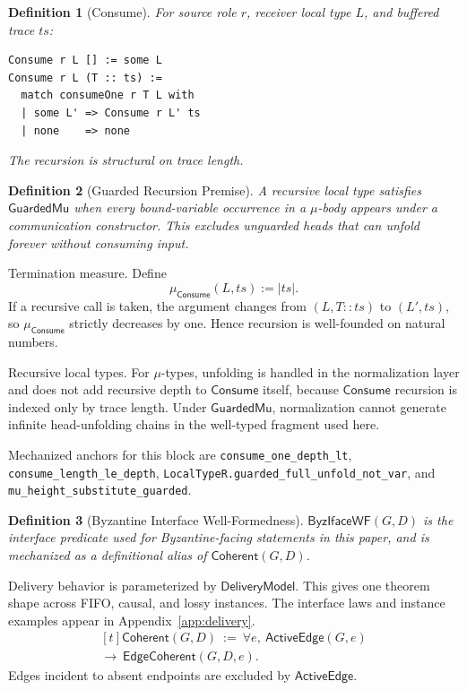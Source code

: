 \documentclass[a4paper,10pt,twocolumn,english]{article}
\numberwithin{equation}{section}
\theoremstyle{paperdef}
\newtheorem{definition}{Definition}[section]
\theoremstyle{paperplain}
\theoremstyle{paperdef}
\theoremstyle{paperremark}
\newcommand{\Coherent}{\ensuremath{\mathsf{Coherent}}}
\newcommand{\EdgeCoherent}{\ensuremath{\mathsf{EdgeCoherent}}}
\newcommand{\ActiveEdge}{\ensuremath{\mathsf{ActiveEdge}}}
\newcommand{\Consume}{\ensuremath{\mathsf{Consume}}}
\newcommand{\DeliveryModel}{\ensuremath{\mathsf{DeliveryModel}}}
\newcommand{\ByzIfaceWF}{\ensuremath{\mathsf{ByzIfaceWF}}}
\begin{document}
\begin{definition}[Consume]
	For source role $r$, receiver local type $L$, and buffered trace $ts$:
	\noindent\begin{minipage}{\columnwidth}
		\begin{lstlisting}
Consume r L [] := some L
Consume r L (T :: ts) :=
  match consumeOne r T L with
  | some L' => Consume r L' ts
  | none    => none
\end{lstlisting}
	\end{minipage}
	The recursion is structural on trace length.
\end{definition}

\begin{definition}[Guarded Recursion Premise]
	A recursive local type satisfies $\mathsf{GuardedMu}$ when every bound-variable
	occurrence in a $\mu$-body appears under a communication constructor. This
	excludes unguarded heads that can unfold forever without consuming input.
\end{definition}

Termination measure. Define
\begin{equation}
	\label{eq:p1-consume-measure}
	\mu_{\Consume}(L,ts) := |ts|.
\end{equation}
If a recursive call is taken, the argument changes from $(L,T::ts)$ to
$(L',ts)$, so $\mu_{\Consume}$ strictly decreases by one. Hence recursion is
well-founded on natural numbers.

Recursive local types. For $\mu$-types, unfolding is handled in the
normalization layer and does not add recursive depth to $\Consume$ itself,
because $\Consume$ recursion is indexed only by trace length. Under
$\mathsf{GuardedMu}$, normalization cannot generate infinite head-unfolding
chains in the well-typed fragment used here.

Mechanized anchors for this block are
\nolinkurl{consume_one_depth_lt},
\nolinkurl{consume_length_le_depth},
\nolinkurl{LocalTypeR.guarded_full_unfold_not_var}, and
\nolinkurl{mu_height_substitute_guarded}.

\begin{definition}[Byzantine Interface Well-Formedness]
	$\ByzIfaceWF(G, D)$ is the interface predicate used for Byzantine-facing statements in this paper, and is mechanized as a definitional alias of $\Coherent(G, D)$.
\end{definition}

Delivery behavior is parameterized by \DeliveryModel. This gives one theorem shape across FIFO, causal, and lossy instances. The interface laws and instance examples appear in Appendix~\ref{app:delivery}.
\begin{equation}
	\label{eq:p1-active-edge-boundary}
	\begin{aligned}[t]
		\Coherent(G,D)\ :=\ \forall e,\ \ActiveEdge(G,e)
		\\
		\to\ \EdgeCoherent(G,D,e).
	\end{aligned}
\end{equation}
Edges incident to absent endpoints are excluded by $\ActiveEdge$.
\end{document}
